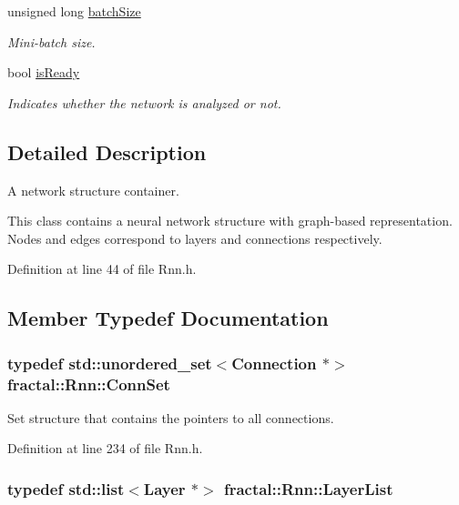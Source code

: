 \begin{DoxyCompactItemize}
unsigned long \hyperlink{classfractal_1_1Rnn_a18afcf7887c5a86d4f6cccae67646ed0}{batch\+Size}
\begin{DoxyCompactList}\small\item\em Mini-\/batch size. \end{DoxyCompactList}\item 
bool \hyperlink{classfractal_1_1Rnn_a5d66a5d50e9c7282f467e3e1a947ff17}{is\+Ready}
\begin{DoxyCompactList}\small\item\em Indicates whether the network is analyzed or not. \end{DoxyCompactList}\end{DoxyCompactItemize}


\subsection{Detailed Description}
A network structure container. 

This class contains a neural network structure with graph-\/based representation. Nodes and edges correspond to layers and connections respectively. 

Definition at line 44 of file Rnn.\+h.



\subsection{Member Typedef Documentation}
\hypertarget{classfractal_1_1Rnn_a9899dedd3e89a1375a09ba7cc86fbf2b}{
\subsubsection[{Conn\+Set}]{\setlength{\rightskip}{0pt plus 5cm}typedef std\+::unordered\+\_\+set$<${\bf Connection} $\ast$$>$ {\bf fractal\+::\+Rnn\+::\+Conn\+Set}\hspace{0.3cm}{\ttfamily [protected]}}}\label{classfractal_1_1Rnn_a9899dedd3e89a1375a09ba7cc86fbf2b}


Set structure that contains the pointers to all connections. 



Definition at line 234 of file Rnn.\+h.

\hypertarget{classfractal_1_1Rnn_a47ec5588c6a0bed3c6af1b34ea8e8070}{
\subsubsection[{Layer\+List}]{\setlength{\rightskip}{0pt plus 5cm}typedef std\+::list$<${\bf Layer} $\ast$$>$ {\bf fractal\+::\+Rnn\+::\+Layer\+List}\hspace{0.3cm}{\ttfamily [protected]}}}\label{classfractal_1_1Rnn_a47ec5588c6a0bed3c6af1b34ea8e8070}


